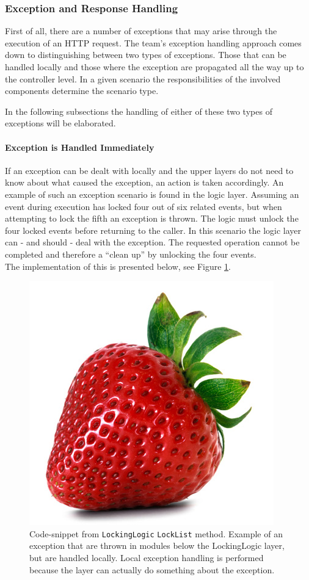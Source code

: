 \subsubsection{Exception and Response Handling}
First of all, there are a number of exceptions that may arise through the execution of an HTTP request. The team's exception handling approach comes down to distinguishing between two types of exceptions. Those that can be handled locally and those where the exception are propagated all the way up to the controller level. In a given scenario the responsibilities of the involved components determine the scenario type. 

In the following subsections the handling of either of these two types of exceptions will be elaborated.

\paragraph{Exception is Handled Immediately}
If an exception can be dealt with locally and the upper layers do not need to know about what caused the exception, an action is taken accordingly. An example of such an exception scenario is found in the logic layer. Assuming an event during execution has locked four out of six related events, but when attempting to lock the fifth an exception is thrown. The logic must unlock the four locked events before returning to the caller. In this scenario the logic layer can - and should - deal with the exception. The requested operation cannot be completed and therefore a “clean up” by unlocking the four events.\\

The implementation of this is presented below, see Figure \ref{fig:LockList}.
\begin{figure}[h!]
\centering
\includegraphics[width=0.3\linewidth]{figures/strawberry}
\caption{\label{fig:LockList}Code-snippet from \texttt{LockingLogic} \texttt{LockList} method. Example of an exception that are thrown in modules below the LockingLogic layer, but are handled locally. Local exception handling is performed because the layer can actually do something about the exception. }
\end{figure}

